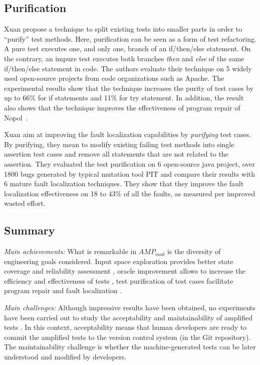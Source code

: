 \subsection{Purification}
\label{subsec:sota:category-4:purification}

Xuan \etal\cite{xuan:hal-01309004} propose a technique to split existing tests into smaller parts in order to ``purify'' test methods. 
Here, purification can be seen as a form of test refactoring. 
A pure test executes one, and only one, branch of an if/then/else statement. 
On the contrary, an impure test executes both branches \emph{then} and \emph{else} of the same if/then/else statement in code. 
The authors evaluate their technique on 5 widely used open-source projects from code organizations such as Apache. 
The experimental results show that the technique increases the purity of test cases by up to 66\% for if statements and 11\% for try statement. 
In addition, the result also shows that the technique improves the effectiveness of program repair of Nopol~\cite{xuanTSE2016Nopol}.

Xuan \etal\cite{xuan2014test} aim at improving the fault localization capabilities by \emph{purifying} test cases. 
By purifying, they mean to modify existing failing test methods into single assertion test cases and remove all statements that are not related to the assertion. 
They evaluated the test purification on 6 open-source java project, over 1800 bugs generated by typical mutation tool PIT and compare their results with 6 mature fault localization techniques. 
They show that they improve the fault localization effectiveness on 18 to 43\% of all the faults, as measured per improved wasted effort. 

\subsection{Summary}
\label{subsec:sota:category-4:summary}

\emph{Main achievements:}
What is remarkable in $AMP_{mod}$ is the diversity of engineering goals considered. 
Input space exploration provides better state coverage \cite{Dallmeier2010} and reliability assessment \cite{HamletV93}, 
oracle improvement allows to increase the efficiency and effectiveness of tests \cite{Xie2006, Carzaniga:2014:COI:2568225.2568287, Joshi07, Mouelhi:2009, reassert2009}, test purification of test cases facilitate program repair \cite{xuan:hal-01309004} and fault localization \cite{xuan2014test}.

\emph{Main challenges:}
Although impressive results have been obtained, no experiments have been carried out to study the acceptability and maintainability of amplified tests \cite{Dallmeier2010, Xie2006, HamletV93,  Carzaniga:2014:COI:2568225.2568287, Joshi07, Mouelhi:2009, reassert2009, xuan:hal-01309004, xuan2014test}. 
In this context, acceptability means that human developers are ready to commit the amplified tests to the version control system (\eg in the Git repository). 
The maintainability challenge is whether the machine-generated tests can be later understood and modified by developers.

